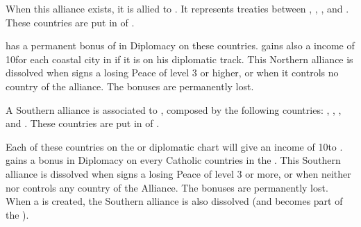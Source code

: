 \begin{digressions}



  \effetlong
  \aparag When this alliance exists, it is allied to \HOLhol.  It represents
  treaties between \paysOldenburg, \paysHanovre, \paysHesse, \paysHanse and
  \paysBerg.
  \bparag These countries are put in \AM of \HOL.
  
  \aparag \HOL has a permanent bonus of  in Diplomacy on these
  countries.
  \aparag \HOL gains also a income of 10\ducats for each coastal city in
  \paysHanse if it is on his diplomatic track.
  \bparag This Northern alliance is dissolved when \HOL signs a losing Peace
  of level 3 or higher, or when it controls no country of the alliance. The
  bonuses are permanently lost.



  \effetlong
  \aparag A Southern \HRE alliance is associated to \HAB, composed by the
  following countries: \paysBaviere, \paysMayence, \paysAlsace, \paysBade and
  \paysWurtemberg.
  \bparag These countries are put in \AM of \HAB.

  \aparag Each of these countries on the \HAB or \MAJHAB diplomatic chart will
  give an income of 10\ducats to \MAJHAB.
  \aparag \MAJHAB gains a  bonus in Diplomacy on every Catholic
  countries in the \HRE.
  \aparag This Southern alliance is dissolved when \MAJHAB signs a losing
  Peace of level 3 or more, or when neither \MAJHAB nor \HAB controls any
  country of the Alliance.  The bonuses are permanently lost.
  \aparag When a \GE is created, the Southern alliance is also dissolved (and
  becomes part of the \GE).




\end{digressions}
